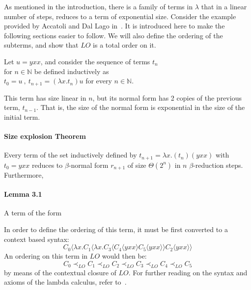 \documentclass[12pt]{article}
\begin{document}
As mentioned in the introduction, there is a family of terms in $\lambda$ that in a linear number of steps, reduces to a term of exponential size. Consider the example provided by Accatoli and Dal Lago in~\cite{beta-invariance}. It is introduced here to make the following sections easier to follow. We will also define the ordering of the subterms, and show that $LO$ is a total order on it.
\begin{center}
  Let $u = yxx$, and consider the sequence of terms $t_{n}$  \\ for $n \in \mathbb{N}$ be defined inductively as \\
  $t_{0} = u \ , \ t_{n + 1} = (\lambda x.t_{n})u$ for every $n \in \mathbb{N}$.
\end{center}
This term has size linear in $n$, but its normal form has 2 copies of the previous term, $t_{n-1}$. That is, the size of the normal form is exponential in the size of the initial term.
\paragraph{\textbf{Size explosion Theorem}} Every term of the set inductively defined by $t_{n+1} = \lambda x . (t_{n})(yxx)$ with $t_{0} = yxx$ reduces to $\beta$-normal form $r_{n+1}$ of size $\Theta (2^{n})$ in $n$ $\beta$-reduction steps. Furthermore,

\paragraph{\textbf{Lemma 3.1}} A term of the form

In order to define the ordering of this term, it must be first converted to a context based syntax:
$$C_{0} \langle \lambda x. C_{1} \langle \lambda x. C_{3} \langle C_{4} \langle yxx \rangle C_{5} \langle yxx \rangle \rangle C_{2} \langle yxx \rangle \rangle $$
An ordering on this term in $LO$ would then be:
\begin{equation}
 C_{0} \prec_{LO} C_{1} \prec_{LO} C_{2} \prec_{LO} C_{3} \prec_{LO} C_{4} \prec_{LO} C_{5}
\end{equation}
by means of the contextual closure of $LO$.
For further reading on the syntax and axioms of the lambda calculus, refer to~\cite{barendregt1984lambda}.
\end{document}
